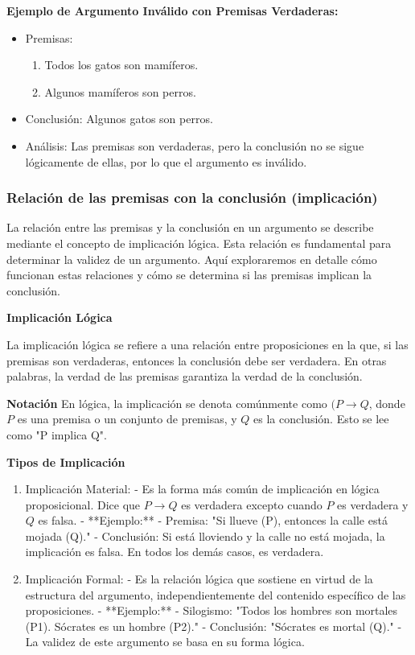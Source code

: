 \textbf{Ejemplo de Argumento Inválido con Premisas Verdaderas:}


\begin{itemize}
   \item Premisas:
         \begin{enumerate}
            \item Todos los gatos son mamíferos.
            \item Algunos mamíferos son perros.
         \end{enumerate}
   \item Conclusión: Algunos gatos son perros.
   \item Análisis: Las premisas son verdaderas, pero la conclusión no se sigue lógicamente de ellas, por lo que el argumento es inválido.
\end{itemize}


\subsubsection{Relación de las premisas con la conclusión (implicación)}

La relación entre las premisas y la conclusión en un argumento se describe mediante el concepto de implicación lógica. Esta relación es fundamental para determinar la validez de un argumento. Aquí exploraremos en detalle cómo funcionan estas relaciones y cómo se determina si las premisas implican la conclusión.

\textbf{Implicación Lógica}

La implicación lógica se refiere a una relación entre proposiciones en la que, si las premisas son verdaderas, entonces la conclusión debe ser verdadera. En otras palabras, la verdad de las premisas garantiza la verdad de la conclusión.

\textbf{Notación}
En lógica, la implicación se denota comúnmente como $(P \rightarrow Q $, donde $P$  es una premisa o un conjunto de premisas, y $Q$ es la conclusión. Esto se lee como "P implica Q".

\textbf{Tipos de Implicación}

\begin{enumerate}
   \item Implicación Material:
         - Es la forma más común de implicación en lógica proposicional. Dice que \( P \rightarrow Q \) es verdadera excepto cuando \( P \) es verdadera y \( Q \) es falsa.
         - **Ejemplo:**
         - Premisa: "Si llueve (P), entonces la calle está mojada (Q)."
         - Conclusión: Si está lloviendo y la calle no está mojada, la implicación es falsa. En todos los demás casos, es verdadera.
         
   \item Implicación Formal:
         - Es la relación lógica que sostiene en virtud de la estructura del argumento, independientemente del contenido específico de las proposiciones.
         - **Ejemplo:**
         - Silogismo: "Todos los hombres son mortales (P1). Sócrates es un hombre (P2)."
         - Conclusión: "Sócrates es mortal (Q)."
         - La validez de este argumento se basa en su forma lógica.
\end{enumerate}


